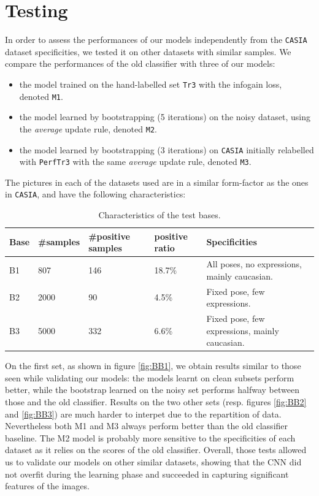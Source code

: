 \documentclass[a4paper]{article}
\begin{document}
\section{Testing}
    In order to assess the performances of our models independently from the \texttt{CASIA} dataset specificities, we tested it on other datasets with similar samples. We compare the performances of the old classifier with three of our models:
    \begin{itemize}
    	\item the model trained on the hand-labelled set \texttt{Tr3} with the infogain loss, denoted \texttt{M1}.
    	\item the model learned by bootstrapping (5 iterations) on the noisy dataset, using the \emph{average} update rule,  denoted \texttt{M2}.
    	\item the model learned by bootstrapping (3 iterations) on \texttt{CASIA} initially relabelled with \texttt{PerfTr3} with the same \emph{average} update rule, denoted \texttt{M3}.
    \end{itemize}
    The pictures in each of the datasets used are in a similar form-factor as the ones in \texttt{CASIA}, and have the following characteristics:
   
	\begin{table}[H]
	\centering
	\begin{tabular}{|l|l|l|l|l|}
	\hline
	Base & \#samples & \#positive samples & positive ratio & Specificities                                  \\ \hline
	B1   & 807       & 146       &   18.7\%     & All poses, no expressions, mainly caucasian.   \\ \hline
	B2   & 2000      & 90     &      4.5\%      & Fixed pose, few expressions.                   \\ \hline
	B3   & 5000      & 332    &       6.6\%     & Fixed pose, few expressions, mainly caucasian. \\ \hline
	\end{tabular}
	\caption{Characteristics of the test bases.}
	\end{table}
	On the first set, as shown in figure \ref{fig:BB1}, we obtain results similar to those seen while validating our models: the models learnt on clean subsets perform better, while the bootstrap learned on the noisy set performs halfway between those and the old classifier. Results on the two other sets (resp. figures \ref{fig:BB2} and \ref{fig:BB3}) are much harder to interpet due to the repartition of data. Nevertheless both M1 and M3 always perform better than the old classifier baseline. The M2 model is probably more sensitive to the specificities of each dataset as it relies on the scores of the old classifier. Overall, those tests allowed us to validate our models on other similar datasets, showing that the CNN did not overfit during the learning phase and succeeded in capturing significant features of the images.
	
\end{document}
